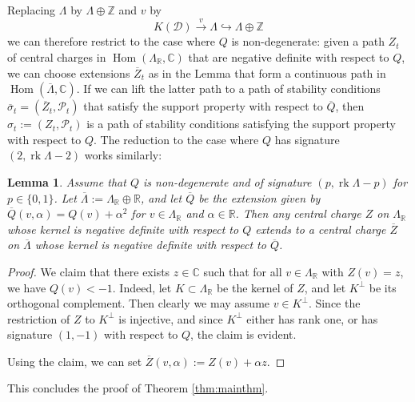 \documentclass[leqno,11pt,twoside]{amsart}
\newtheorem{Lem}[Thm]{Lemma}
\theoremstyle{definition}
\begin{document}
Replacing $\Lambda$ by $\Lambda \oplus {\ensuremath{\mathbb{Z}}}$ and $v$ by 
\[ K({\ensuremath{\mathcal D}}) \xrightarrow{v} \Lambda {\ensuremath{\hookrightarrow}} \Lambda \oplus {\ensuremath{\mathbb{Z}}} \]
we can therefore restrict to the case where $Q$ is non-degenerate: given a path $Z_t$ of central
charges in ${\mathop{\mathrm{Hom}}\nolimits}(\Lambda_{\ensuremath{\mathbb{R}}}, {\ensuremath{\mathbb{C}}})$ that are negative definite with respect to $Q$, we can choose
extensions $\overline{Z}_t$ as in the Lemma that form a continuous path in ${\mathop{\mathrm{Hom}}\nolimits}(\overline{\Lambda}, {\ensuremath{\mathbb{C}}})$.
If we can lift the latter path to a path of stability conditions
$\overline{\sigma}_t = (\overline{Z}_t, {\ensuremath{\mathcal P}}_t)$ that satisfy the support property 
with respect to $\overline{Q}$, then $\sigma_t := (Z_t, {\ensuremath{\mathcal P}}_t)$ is a
path of stability conditions satisfying the support property with respect to $Q$.
The reduction to the case where $Q$ has signature
$(2, {\mathop{\mathrm{rk}}} \Lambda -2)$ works similarly:

\begin{Lem} Assume that $Q$ is non-degenerate and of signature $(p, {\mathop{\mathrm{rk}}} \Lambda -p)$ for $p \in \{
0, 1\}$. 
Let $\overline{\Lambda} := \Lambda_{\ensuremath{\mathbb{R}}} \oplus {\ensuremath{\mathbb{R}}}$, and let $\overline{Q}$ be the extension given by
$\overline{Q}(v, \alpha) = Q(v) + \alpha^2$ for $v \in \Lambda_{\ensuremath{\mathbb{R}}}$ and $\alpha \in {\ensuremath{\mathbb{R}}}$. 
Then any central charge $Z$ on $\Lambda_{\ensuremath{\mathbb{R}}}$ whose kernel is negative definite with respect to $Q$ extends to
a central charge $\overline{Z}$ on $\overline{\Lambda}$ whose kernel is negative definite with respect to
$\overline{Q}$. 
\end{Lem}
\begin{proof}
We claim that there exists $z \in {\ensuremath{\mathbb{C}}}$ such that for all $v \in \Lambda_{\ensuremath{\mathbb{R}}}$ with $Z(v) = z$, we have
$Q(v) < -1$. Indeed, 
let $K \subset \Lambda_{\ensuremath{\mathbb{R}}}$ be the kernel of $Z$, and let $K^\perp$ be its orthogonal complement. Then clearly
we may assume $v \in K^\perp$. Since the restriction of $Z$ to $K^\perp$ is injective, and since
$K^\perp$ either has rank one, or has signature $(1, -1)$ with respect to $Q$, the claim is evident.

Using the claim, we can set $\overline Z(v, \alpha) := Z(v) + \alpha z$. 
\end{proof}
This concludes the proof of Theorem \ref{thm:mainthm}. 
\end{document}
